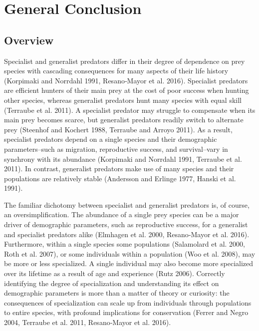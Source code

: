 \documentclass{sfuthesis}
\begin{document}
\hypertarget{general-conclusion}{%
\section{General Conclusion}\label{general-conclusion}}

\hypertarget{overview}{%
\subsection{Overview}\label{overview}}

Specialist and generalist predators differ in their degree of dependence on prey species with cascading consequences for many aspects of their life history (Korpimaki and Norrdahl 1991, Resano‐Mayor et al. 2016). Specialist predators are efficient hunters of their main prey at the cost of poor success when hunting other species, whereas generalist predators hunt many species with equal skill (Terraube et al. 2011). A specialist predator may struggle to compensate when its main prey becomes scarce, but generalist predators readily switch to alternate prey (Steenhof and Kochert 1988, Terraube and Arroyo 2011). As a result, specialist predators depend on a single species and their demographic parameters--such as migration, reproductive success, and survival--vary in synchrony with its abundance (Korpimaki and Norrdahl 1991, Terraube et al. 2011). In contrast, generalist predators make use of many species and their populations are relatively stable (Andersson and Erlinge 1977, Hanski et al. 1991).

The familiar dichotomy between specialist and generalist predators is, of course, an oversimplification. The abundance of a single prey species can be a major driver of demographic parameters, such as reproductive success, for a generalist and specialist predators alike (Elmhagen et al. 2000, Resano‐Mayor et al. 2016). Furthermore, within a single species some populations (Salamolard et al. 2000, Roth et al. 2007), or some individuals within a population (Woo et al. 2008), may be more or less specialized. A single individual may also become more specialized over its lifetime as a result of age and experience (Rutz 2006). Correctly identifying the degree of specialization and understanding its effect on demographic parameters is more than a matter of theory or curiosity: the consequences of specialization can scale up from individuals through populations to entire species, with profound implications for conservation (Ferrer and Negro 2004, Terraube et al. 2011, Resano‐Mayor et al. 2016).
\end{document}
